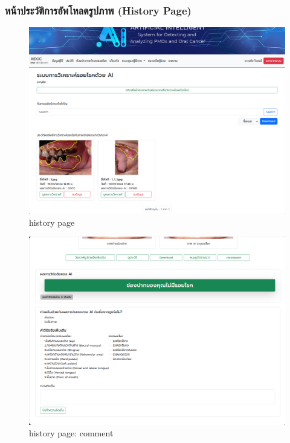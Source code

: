 \subsubsection{หน้าประวัติการอัพโหลดรูปภาพ (History Page)}

\begin{figure}[H]
  \centering
  \graphicspath{{./images/}}
  \includegraphics[scale=0.3]{history_user.png}
  \caption{history page}
  \label{fig:history_user}
\end{figure}

\begin{figure}[H]
  \centering
  \graphicspath{{./images/}}
  \includegraphics[scale=0.3]{comment_user.png}
  \caption{history page: comment}
  \label{fig:comment_user}
\end{figure}
